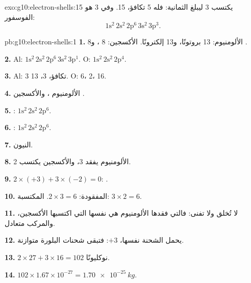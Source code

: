 \begin{solution}{exo:g10:electron-shells:15}
يكتسب 3  ليبلغ الثمانية: فله 5  تكافؤ، 
15. وفي  3 هو الفوسفور:
\[ 1\mathrm{s}^2\,2\mathrm{s}^2\,2\mathrm{p}^6\,3\mathrm{s}^2\,3\mathrm{p}^3. \]
\end{solution}

\begin{solution}{pb:g10:electron-shells:1}
\textbf{1.} الألومنيوم: 13 بروتونًا، و13 إلكترونًا. الأكسجين: 8 ، و8
.

\textbf{2.} Al: $1\mathrm{s}^2\,2\mathrm{s}^2\,2\mathrm{p}^6\,3\mathrm{s}^2\,3\mathrm{p}^1$.
O: $1\mathrm{s}^2\,2\mathrm{s}^2\,2\mathrm{p}^4$.

\textbf{3.} Al: 3  تكافؤ،  3،  13. O: 6،  2،
 16.

\textbf{4.} الألومنيوم ، والأكسجين .

\textbf{5.} : $1\mathrm{s}^2\,2\mathrm{s}^2\,2\mathrm{p}^6$.

\textbf{6.} : $1\mathrm{s}^2\,2\mathrm{s}^2\,2\mathrm{p}^6$.

\textbf{7.} النيون.

\textbf{8.} الألومنيوم يفقد 3، والأكسجين يكتسب 2.

\textbf{9.} $2 \times (+3) + 3 \times (-2) = 0$: .

\textbf{10.} المفقودة: $2 \times 3 = 6$. المكتسبة: $3 \times 2 = 6$.

\textbf{11.}  لا تُخلق ولا تفنى: فالتي فقدها الألومنيوم هي نفسها
التي اكتسبها الأكسجين، والمركب متعادل.

\textbf{12.} يحمل الشحنة نفسها، $+3$: فتبقى شحنات البلورة
متوازنة.

\textbf{13.} $2 \times 27 + 3 \times 16 = 102$ نوكليونًا.

\textbf{14.} $102 \times 1.67 \times 10^{-27} = \qty{1.70e-25}{kg}$.


\end{solution}
